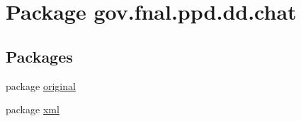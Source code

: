\hypertarget{namespacegov_1_1fnal_1_1ppd_1_1dd_1_1chat}{\section{Package gov.\-fnal.\-ppd.\-dd.\-chat}
\label{namespacegov_1_1fnal_1_1ppd_1_1dd_1_1chat}
}
\subsection*{Packages}
\begin{DoxyCompactItemize}
\item 
package \hyperlink{namespacegov_1_1fnal_1_1ppd_1_1dd_1_1chat_1_1original}{original}
\item 
package \hyperlink{namespacegov_1_1fnal_1_1ppd_1_1dd_1_1chat_1_1xml}{xml}
\end{DoxyCompactItemize}
